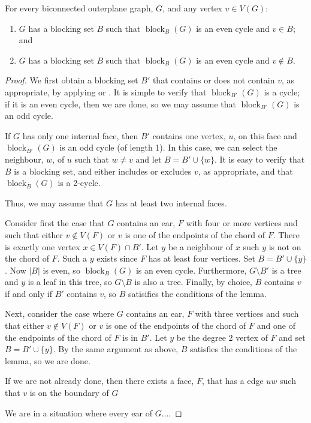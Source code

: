 \documentclass{patmorin}
\DeclareMathOperator{\block}{block}
\begin{document}
\begin{lem}
  For every biconnected outerplane graph, $G$, and any vertex $v\in V(G)$:
  \begin{enumerate}
    \item $G$ has a blocking set $B$ such that $\block_B(G)$ is an even cycle 
       and $v\in B$; and
    \item $G$ has a blocking set $B$ such that $\block_B(G)$ is an even cycle 
       and $v\not\in B$.
  \end{enumerate}
\end{lem}

\begin{proof}
  We first obtain a blocking set $B'$ that contains or does not
  contain $v$, as appropriate, by applying  or
  . It is simple to verify that $\block_{B'}(G)$
  is a cycle;  if it is an even cycle, then we are done, so we may assume
  that $\block_{B'}(G)$ is an odd cycle.

  If $G$ has only one internal face, then $B'$ contains one vertex,
  $u$, on this face and $\block_{B'}(G)$ is an odd cycle (of length 1).
  In this case, we can select the neighbour, $w$, of $u$ such that
  $w\neq v$ and let $B=B'\cup\{w\}$.  It is easy to verify that $B$ is
  a blocking set, and either includes or excludes $v$, as appropriate,
  and that $\block_B(G)$ is a 2-cycle.

  Thus, we may assume that $G$ has at least two internal faces.

  Consider first the case that $G$ contains an ear, $F$ with four or
  more vertices and such that either $v\not\in V(F)$ or $v$ is one of
  the endpoints of the chord of $F$. There is exactly one vertex $x\in
  V(F)\cap B'$. Let $y$ be a neighbour of $x$ such $y$ is not on the
  chord of $F$. Such a $y$ exists since $F$ has at least four vertices.
  Set $B=B'\cup \{y\}$.  Now $|B|$ is even, so $\block_B(G)$ is an
  even cycle.  Furthermore, $G\setminus B'$ is a tree and $y$ is a leaf
  in this tree, so $G\setminus B$ is also a tree.  Finally, by choice,
  $B$ contains $v$ if and only if $B'$ contains $v$, so $B$ satisifies
  the conditions of the lemma.

  Next, consider the case where $G$ contains an ear, $F$ with three
  vertices and such that either $v\not\in V(F)$ or $v$ is one of the
  endpoints of the chord of $F$ and one of the endpoints of the chord
  of $F$ is in $B'$.  Let $y$ be the degree 2 vertex of $F$ and set
  $B=B'\cup \{y\}$.  By the same argument as above, $B$ satisfies the
  conditions of the lemma, so we are done.

  If we are not already done, then there exists a face, $F$, that has
  a edge $uw$ such that $v$ is on the boundary of $G$

  We are in a situation where every ear of $G$....
\end{proof}
\end{document}
